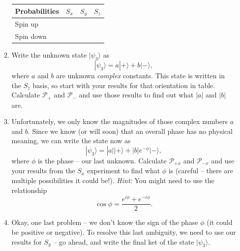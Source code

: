 \documentclass[10pt, letterpaper, twoside, openany]{article}
\newcommand{\ket}[1]{| #1 \rangle}
\newcounter{problem}[section]
\begin{document}
\begin{enumerate}
\begin{enumerate}
\begin{center}
\begin{tabular}{ p{1in} | p{1in} | p{1in} | p{1in}}
Probabilities & $S_x$ & $S_y$ & $S_z$ \\
\hline
Spin up & & & \\
\hline
Spin down & & & \\
\hline
\end{tabular}
\end{center}


\item Write the unknown state $\ket{\psi_3}$ as 
\[
\ket{\psi_3} = a \ket{+} + b\ket{-},
\]
where $a$ and $b$ are unknown \emph{complex} constants.  This state is written in the $S_z$ basis, so start with your results for that orientation in table.  Calculate $\mathcal{P}_+$ and $\mathcal{P}_-$ and use those results to find out what $|a|$ and $|b|$ are.  

\newpage

\item Unfortunately, we only know the magnitudes of those complex numbers $a$ and $b$.  Since we know (or will soon) that an overall phase has no physical meaning, we can write the state now as 
\[
\ket{\psi_3} = |a| \ket{+} + |b| e^{-\phi}\ket{-},
\]
where $\phi$ is the phase -- our last unknown.  Calculate  $\mathcal{P}_{+x}$ and $\mathcal{P}_{-x}$ and use your results from the $S_x$ experiment to find what $\phi$ is (careful -- there are multiple possibilities it could be!).  \emph{Hint:} You might need to use the relationship
\[
\cos\phi = \frac{e^{i\phi} + e^{-i\phi}}{2}.
\]

\vspace{3in}

\item Okay, one last problem -- we don't know the sign of the phase $\phi$ (it could be positive or negative).  To resolve this last ambiguity, we need to use our results for $S_y$ -- go ahead, and write the final ket of the state $\ket{\psi_3}$. 

\end{enumerate}
\end{enumerate}
\end{document}
